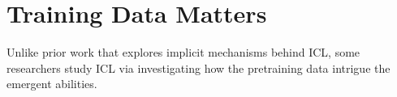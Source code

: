 \section{Training Data Matters}
Unlike prior work that explores implicit mechanisms behind ICL, some researchers study ICL via investigating how the pretraining data intrigue the emergent abilities.


